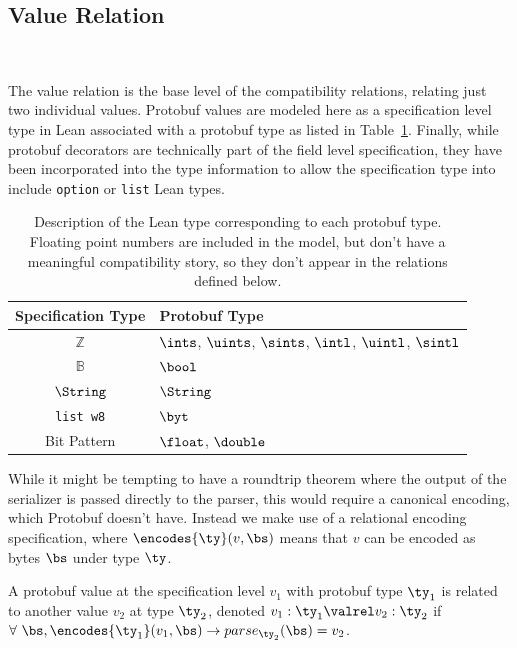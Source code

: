\subsection{Value Relation}~\label{sec:val-rel}

The value relation is the base level of the compatibility relations, relating
just two individual values. Protobuf values are modeled here as a specification
level type in Lean associated with a protobuf type as listed in
Table~\ref{tab:val-spec}. Finally, while protobuf decorators are technically
part of the field level specification, they have been incorporated into the type
information to allow the specification type into include \texttt{option} or
\texttt{list} Lean types.

\begin{table}[H]
	\centering
	\begin{tabular}{cl}
      \toprule
      Specification Type & Protobuf Type \\
      \midrule
      $\mathbb{Z}$ & $\ints$, $\uints$, $\sints$,
            $\intl$, $\uintl$, $\sintl$ \\
      $\mathbb{B}$ & $\bool$    \\
      $\String$ & $\String$    \\
      \texttt{list w8}  & $\byt$    \\
      Bit Pattern & $\float$, $\double$ \\
      \bottomrule
	\end{tabular}

	\vspace{4mm}
	\caption[]{Description of the Lean type corresponding to each protobuf
      type. Floating point numbers are included in the model, but don't have a
      meaningful compatibility story, so they don't appear in the relations
      defined below.}\label{tab:val-spec}
\end{table}

While it might be tempting to have a roundtrip theorem where the output of the
serializer is passed directly to the parser, this would require a canonical
encoding, which Protobuf doesn't have. Instead we make use of a relational
encoding specification, where $\encodes{\ty}(v, \bs)$ means that $v$ can be encoded
as bytes $\bs$ under type $\ty$.

\vspace{1em}
\begin{definition}
  A protobuf value at the specification level $v_1$ with protobuf type $\ty_1$ is
  related to another value $v_2$ at type $\ty_2$, denoted $v_1 : \ty_1 \valrel v_2 : \ty_2$
  if $\forall\ \bs, \encodes{\ty_1}(v_1, \bs) \rightarrow parse_{\ty_2}(\bs) = v_2$.
\end{definition}


